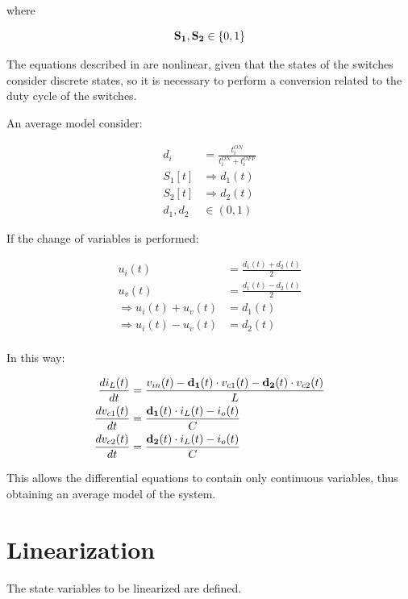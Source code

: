 where

\begin{equation}
{\bf S}_{\bf 1},{\bf S}_{\bf 2} \in \{0,1\}
\end{equation}

The equations described in are nonlinear, given that the states of the switches consider discrete states, so it is necessary to perform a conversion related to the duty cycle of the switches.

An average model consider:

\begin{align}
{d}_{i}&=\frac{{t}_{i}^{ON}}{{t}_{i}^{ON}+{t}_{i}^{OFF}} \nonumber\\
{S}_{1}[t] &\Rightarrow {d}_{1}(t) \nonumber\\
{S}_{2}[t] &\Rightarrow {d}_{2}(t) \nonumber\\
{d}_{1},{d}_{2} &\in (0,1)
\end{align}

If the change of variables is performed:

\begin{align}
{u}_{i}(t) &= \frac{{d}_{1}(t)+{d}_{2}(t)}{2} \nonumber\\
{u}_{v}(t) &= \frac{{d}_{1}(t)-{d}_{2}(t)}{2} \nonumber\\
\Rightarrow {u}_{i}(t)+{u}_{v}(t)&={d}_{1}(t) \nonumber\\
\Rightarrow {u}_{i}(t)-{u}_{v}(t)&={d}_{2}(t) \nonumber\\
\end{align}

In this way:

\begin{align}
\frac{d{i}_{L}(t)}{dt}&=\frac{{v}_{in}(t)-{\bf d}_{\bf 1}(t)\cdot{v}_{c1}(t)-{\bf d}_{\bf 2}(t)\cdot{v}_{c2}(t)}{L} \\
\frac{d{v}_{c1}(t)}{dt}&=\frac{{\bf d}_{\bf 1}(t)\cdot{i}_{L}(t)-{i}_{o}(t)}{C} \\
\frac{d{v}_{c2}(t)}{dt}&=\frac{{\bf d}_{\bf 2}(t)\cdot{i}_{L}(t)-{i}_{o}(t)}{C} 
\end{align}

This allows the differential equations to contain only continuous variables, thus obtaining an average model of the system.

\section{Linearization}

The state variables to be linearized are defined.


